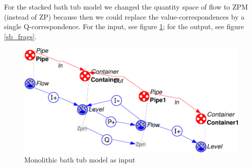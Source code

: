 \documentclass{article} %
\begin{document}
For the stacked bath tub model we changed the quantity space of flow to ZPM
(instead of ZP) because then we could replace the value-correspondences by a
single Q-correspondence.  For the input, see figure \ref{sb_mono}; for the
output, see figure \ref{sb_frags}.

\begin{figure}[ht]
\centering
\includegraphics[scale=0.5]{sb_mono-crop.pdf}
\caption{Monolithic bath tub model as input}
\label{sb_mono}
\end{figure}

\end{document}
